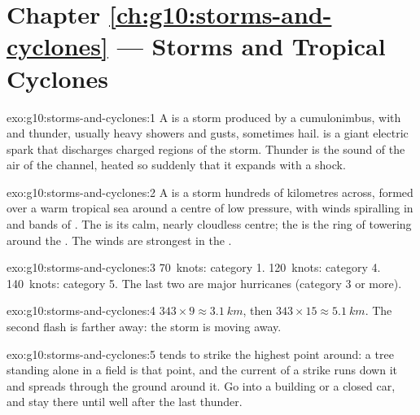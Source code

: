 \section*{Chapter \ref{ch:g10:storms-and-cyclones} --- Storms and Tropical Cyclones}

\begin{solution}{exo:g10:storms-and-cyclones:1}
A  is a storm produced by a cumulonimbus, with  and
thunder, usually heavy showers and gusts, sometimes hail.  is a giant
electric spark that discharges charged regions of the storm. Thunder is the
sound of the air of the  channel, heated so suddenly that it expands
with a shock.
\end{solution}

\begin{solution}{exo:g10:storms-and-cyclones:2}
A  is a storm hundreds of kilometres across, formed over a
warm tropical sea around a centre of low pressure, with winds spiralling in
and bands of . The  is its calm, nearly cloudless centre; the
 is the ring of towering  around the . The winds are
strongest in the .
\end{solution}

\begin{solution}{exo:g10:storms-and-cyclones:3}
\num{70}~knots: category 1. \num{120}~knots: category 4.
\num{140}~knots: category 5. The last two are major hurricanes (category 3
or more).
\end{solution}

\begin{solution}{exo:g10:storms-and-cyclones:4}
$343 \times 9 \approx \qty{3.1}{km}$, then $343 \times 15 \approx
\qty{5.1}{km}$. The second flash is farther away: the storm is moving away.
\end{solution}

\begin{solution}{exo:g10:storms-and-cyclones:5}
 tends to strike the highest point around: a tree standing alone in
a field is that point, and the current of a strike runs down it and spreads
through the ground around it. Go into a building or a closed car, and stay
there until well after the last thunder.
\end{solution}

